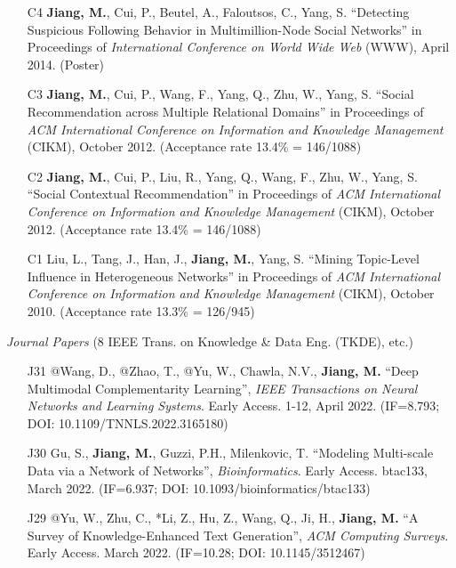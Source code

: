\documentclass[10pt]{article}
\newenvironment{myindentpar}[1]%
{\begin{list}{}%
         {\setlength{\leftmargin}{#1}}%
         \item[]%
}
{\end{list}}
\newcounter{list}
\begin{document}
\begin{myindentpar}{0.00cm}
\begin{enumerate}[leftmargin=.5cm]
\item[C4] \textbf{Jiang, M.}, Cui, P., Beutel, A., Faloutsos, C., Yang, S. ``Detecting Suspicious Following Behavior in Multimillion-Node Social Networks'' in Proceedings of \textit{International Conference on World Wide Web} (WWW), April 2014. (Poster)

\item[C3] \textbf{Jiang, M.}, Cui, P., Wang, F., Yang, Q., Zhu, W., Yang, S. ``Social Recommendation across Multiple Relational Domains'' in Proceedings of \textit{ACM International Conference on Information and Knowledge Management} (CIKM), October 2012. (Acceptance rate 13.4\% = 146/1088)

\item[C2] \textbf{Jiang, M.}, Cui, P., Liu, R., Yang, Q., Wang, F., Zhu, W., Yang, S. ``Social Contextual Recommendation'' in Proceedings of \textit{ACM International Conference on Information and Knowledge Management} (CIKM), October 2012. (Acceptance rate 13.4\% = 146/1088)

\item[C1] Liu, L., Tang, J., Han, J., \textbf{Jiang, M.}, Yang, S. ``Mining Topic-Level Influence in Heterogeneous Networks'' in Proceedings of \textit{ACM International Conference on Information and Knowledge Management} (CIKM), October 2010. (Acceptance rate 13.3\% = 126/945)

\end{enumerate}

\hspace{-0.25cm}\textit{Journal Papers} {\small (8 IEEE Trans. on Knowledge \& Data Eng. (TKDE), etc.)}

\begin{enumerate}[leftmargin=.5cm]

\item[J31] @Wang, D., @Zhao, T., @Yu, W., Chawla, N.V., \textbf{Jiang, M.} ``Deep Multimodal Complementarity Learning'', \textit{IEEE Transactions on Neural Networks and Learning Systems}. Early Access. 1-12, April 2022. (IF=8.793; DOI: 10.1109/TNNLS.2022.3165180)

\item[J30] Gu, S., \textbf{Jiang, M.}, Guzzi, P.H., Milenkovic, T. ``Modeling Multi-scale Data via a Network of Networks'', \textit{Bioinformatics}. Early Access. btac133, March 2022. (IF=6.937; DOI: 10.1093/bioinformatics/btac133)

\item[J29] @Yu, W., Zhu, C., *Li, Z., Hu, Z., Wang, Q., Ji, H., \textbf{Jiang, M.} ``A Survey of Knowledge-Enhanced Text Generation'', \textit{ACM Computing Surveys}. Early Access. March 2022. (IF=10.28; DOI: 10.1145/3512467)


\end{enumerate}
\end{myindentpar}
\end{document}
